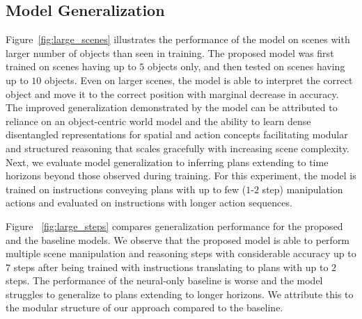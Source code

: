 \subsection{Model Generalization} 
Figure~\ref{fig:large_scenes} illustrates the performance of the model on scenes with larger number of objects than seen in training. 
%
The proposed model was first trained on scenes having up to $5$ objects only, and then tested on scenes having up to $10$ objects. 
%
Even on larger scenes, the model is able to interpret the correct object and move it to the correct position with marginal decrease in accuracy. 
%
The improved generalization demonstrated by the model can be attributed to reliance on an object-centric world model and the ability to learn dense disentangled representations for spatial and action concepts facilitating modular and structured reasoning that scales gracefully with increasing scene complexity.  
Next, we evaluate model generalization to inferring plans extending to time horizons beyond those observed during training. For this experiment, the model is trained on instructions conveying plans with up to few ($1$-$2$ step) manipulation actions and evaluated on instructions with 
longer action sequences. 

Figure ~\ref{fig:large_steps} compares generalization performance for the proposed and the baseline models. We observe that the proposed model is able to perform multiple scene manipulation and reasoning steps with considerable accuracy up to $7$ steps after being trained with instructions translating to plans with up to $2$ steps. 
%
The performance of the neural-only baseline is worse and the model struggles to generalize to plans extending to longer horizons. We attribute this to the modular structure of our approach compared to the baseline.
%
%
%















